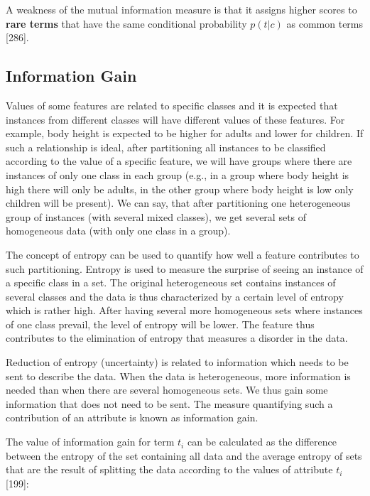 \documentclass[11pt,openany,executivepaper]{book}
\begin{document}
A weakness of the mutual information measure is that it assigns higher scores to \textbf{rare terms} that have the same conditional probability $p(t|c)$ as common terms [286].

\vspace{1em}

\subsection{Information Gain}

Values of some features are related to specific classes and it is expected that instances from different classes will have different values of these features. For example, body height is expected to be higher for adults and lower for children. If such a relationship is ideal, after partitioning all instances to be classified according to the value of a specific feature, we will have groups where there are instances of only one class in each group (e.g., in a group where body height is high there will only be adults, in the other group where body height is low only children will be present). We can say, that after partitioning one heterogeneous group of instances (with several mixed classes), we get several sets of homogeneous data (with only one class in a group).

The concept of entropy can be used to quantify how well a feature contributes to such partitioning. Entropy is used to measure the surprise of seeing an instance of a specific class in a set. The original heterogeneous set contains instances of several classes and the data is thus characterized by a certain level of entropy which is rather high. After having several more homogeneous sets where instances of one class prevail, the level of entropy will be lower. The feature thus contributes to the elimination of entropy that measures a disorder in the data.

Reduction of entropy (uncertainty) is related to information which needs to be sent to describe the data. When the data is heterogeneous, more information is needed than when there are several homogeneous sets. We thus gain some information that does not need to be sent. The measure quantifying such a contribution of an attribute is known as information gain.

The value of information gain for term $t_i$ can be calculated as the difference between the entropy of the set containing all data and the average entropy of sets that are the result of splitting the data according to the values of attribute $t_i$ [199]:
\end{document}
